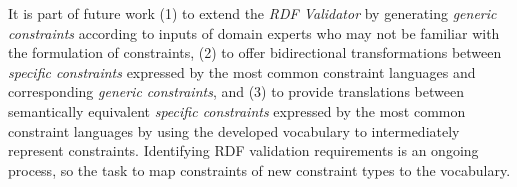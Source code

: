 \documentclass[a4paper,fontsize=11pt]{scrartcl}
\begin{document}
It is part of future work 
(1) to extend the \emph{RDF Validator} by generating \emph{generic constraints} according to inputs of domain experts who may not be familiar with the formulation of constraints,
(2) to offer bidirectional transformations between \emph{specific constraints} expressed by the most common constraint languages and corresponding \emph{generic constraints}, and
(3) to provide translations between semantically equivalent \emph{specific constraints} expressed by the most common constraint languages by using the developed vocabulary to intermediately represent constraints.
Identifying RDF validation requirements is an ongoing process,
so the task to map constraints of new constraint types to the vocabulary.


{}

\setcounter{tocdepth}{1}
\end{document}

